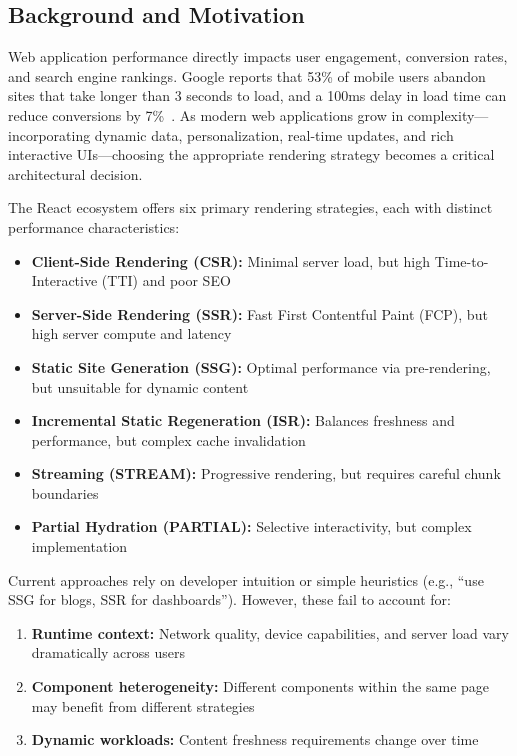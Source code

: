 \documentclass[10pt,twocolumn]{article}
\begin{document}
\subsection{Background and Motivation}

Web application performance directly impacts user engagement, conversion rates, and search engine rankings. Google reports that 53\% of mobile users abandon sites that take longer than 3 seconds to load, and a 100ms delay in load time can reduce conversions by 7\%~\cite{google2023mobile}. As modern web applications grow in complexity---incorporating dynamic data, personalization, real-time updates, and rich interactive UIs---choosing the appropriate rendering strategy becomes a critical architectural decision.

The React ecosystem offers six primary rendering strategies, each with distinct performance characteristics:

\begin{itemize}[nosep]
\item \textbf{Client-Side Rendering (CSR):} Minimal server load, but high Time-to-Interactive (TTI) and poor SEO
\item \textbf{Server-Side Rendering (SSR):} Fast First Contentful Paint (FCP), but high server compute and latency
\item \textbf{Static Site Generation (SSG):} Optimal performance via pre-rendering, but unsuitable for dynamic content
\item \textbf{Incremental Static Regeneration (ISR):} Balances freshness and performance, but complex cache invalidation
\item \textbf{Streaming (STREAM):} Progressive rendering, but requires careful chunk boundaries
\item \textbf{Partial Hydration (PARTIAL):} Selective interactivity, but complex implementation
\end{itemize}

Current approaches rely on developer intuition or simple heuristics (e.g., ``use SSG for blogs, SSR for dashboards''). However, these fail to account for:

\begin{enumerate}[nosep]
\item \textbf{Runtime context:} Network quality, device capabilities, and server load vary dramatically across users
\item \textbf{Component heterogeneity:} Different components within the same page may benefit from different strategies
\item \textbf{Dynamic workloads:} Content freshness requirements change over time
\end{enumerate}
\end{document}
